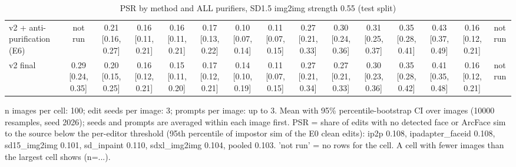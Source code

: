\begin{table}[t]
{\begin{tabular}{lcccccccccccccc}
v2 + anti-purification (E6) & not run & 0.21 [0.16, 0.27] & 0.16 [0.11, 0.21] & 0.16 [0.11, 0.21] & 0.17 [0.13, 0.22] & 0.10 [0.07, 0.14] & 0.11 [0.07, 0.15] & 0.27 [0.21, 0.33] & 0.30 [0.24, 0.36] & 0.31 [0.25, 0.37] & 0.35 [0.28, 0.41] & 0.43 [0.37, 0.49] & 0.16 [0.12, 0.21] & not run \\
v2 final & 0.29 [0.24, 0.35] & 0.20 [0.15, 0.25] & 0.16 [0.12, 0.21] & 0.15 [0.11, 0.20] & 0.17 [0.12, 0.21] & 0.14 [0.10, 0.19] & 0.11 [0.07, 0.15] & 0.27 [0.21, 0.34] & 0.27 [0.21, 0.33] & 0.30 [0.23, 0.36] & 0.35 [0.28, 0.42] & 0.41 [0.35, 0.48] & 0.16 [0.12, 0.21] & not run \\
\bottomrule
\end{tabular}
}
\caption{PSR by method and ALL purifiers, SD1.5 img2img strength 0.55 (test split)}
\label{tab:headline_full}
\par\footnotesize n images per cell: 100; edit seeds per image: 3; prompts per image: up to 3. Mean with 95\% percentile-bootstrap CI over images (10000 resamples, seed 2026); seeds and prompts are averaged within each image first. PSR = share of edits with no detected face or ArcFace sim to the source below the per-editor threshold (95th percentile of impostor sim of the E0 clean edits): ip2p 0.108, ipadapter\_faceid 0.108, sd15\_img2img 0.101, sd\_inpaint 0.110, sdxl\_img2img 0.104, pooled 0.103. 'not run' = no rows for the cell. A cell with fewer images than the largest cell shows (n=...).
\end{table}
